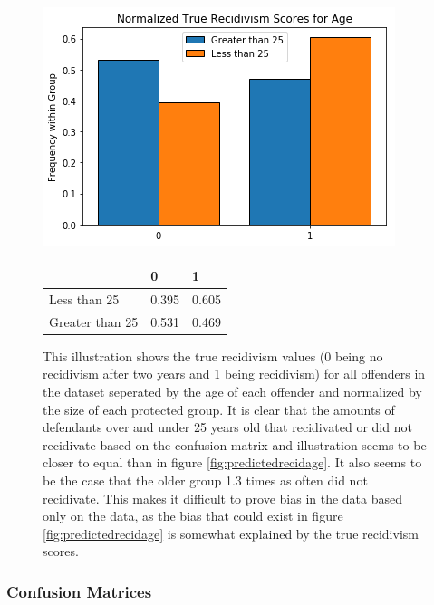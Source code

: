 \documentclass[11pt, fleqn, titlepage]{article}
\begin{document}
		\begin{figure}[H]
		\centering
		\includegraphics[width=0.5\linewidth]{imgs/true_normalized_age}
		\begin{table}[H]
			\centering
			\begin{tabular}{|l|l|l|}
				\hline
				& 0   & 1  \\ \hline
				Less than 25        & 0.395 & 0.605  \\ \hline
				Greater than 25     & 0.531 & 0.469  \\ \hline
			\end{tabular}
		\end{table}
		\caption{This illustration shows the true recidivism values (0 being no recidivism after two years and 1 being recidivism) for all offenders in the dataset seperated by the age of each offender and normalized by the size of each protected group. It is clear that the amounts of defendants over and under 25 years old that recidivated or did not recidivate based on the confusion matrix and illustration seems to be closer to equal than in figure \ref{fig:predictedrecidage}. It also seems to be the case that the older group 1.3 times as often did not recidivate. This makes it difficult to prove bias in the data based only on the data, as the bias that could exist in figure \ref{fig:predictedrecidage} is somewhat explained by the true recidivism scores.}
		\label{fig:truerecidage}
	\end{figure}
	
	\subsubsection{Confusion Matrices}
	
\end{document}

